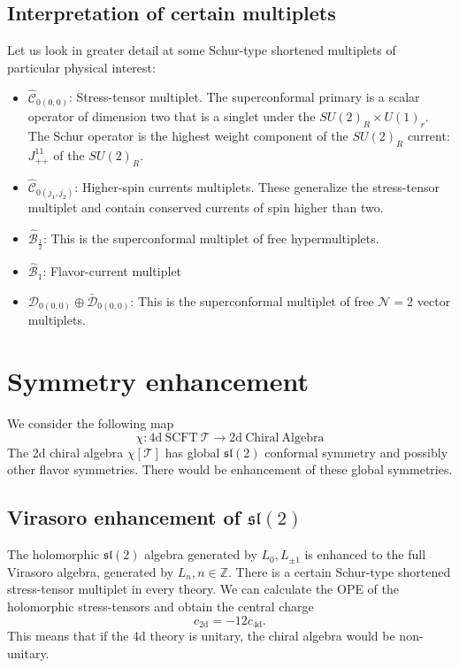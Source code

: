 \documentclass[a4paper,11pt]{article}
\begin{document}
\subsection{Interpretation of certain multiplets}
Let us look in greater detail at some Schur-type shortened multiplets of particular physical interest:
\begin{itemize}
    \item $\hat{\mathcal{C}}_{0(0,0)}$: Stress-tensor multiplet. The superconformal primary is a scalar operator of dimension two that is a singlet under the $SU(2)_R \times U(1)_r$. The Schur operator is the highest weight component of the $SU(2)_R$ current: $J^{11}_{+\dot{+}}$ of the $SU(2)_R$.
    \item $\hat{\mathcal{C}}_{0(j_1,j_2)}$: Higher-spin currents multiplets. These generalize the stress-tensor multiplet and contain conserved currents of spin higher than two.
    \item $\hat{\mathcal{B}}_{\frac{1}{2}}$: This is the superconformal multiplet of free hypermultiplets.
    \item $\hat{\mathcal{B}}_1$: Flavor-current multiplet
    \item $\mathcal{D}_{0(0,0)} \oplus \bar{\mathcal{D}}_{0(0,0)}$: This is the superconformal multiplet of free $\mathcal{N}=2$ vector multiplets.
\end{itemize}

\section{Symmetry enhancement}
We consider the following map
\begin{equation}
    \chi: \mathrm{4d~SCFT~}\mathcal{T} \to \mathrm{2d~Chiral~ Algebra}
\end{equation}
The 2d chiral algebra $\chi[\mathcal{T}]$ has global $\mathfrak{sl}(2)$ conformal symmetry and possibly other flavor symmetries. There would be enhancement of these global symmetries.

\subsection{Virasoro enhancement of $\mathfrak{sl}(2)$}
The holomorphic $\mathfrak{sl}(2)$ algebra generated by $L_0, L_{\pm 1}$ is enhanced to the full Virasoro algebra, generated by $L_n, n \in \mathbb{Z}$. There is a certain Schur-type shortened stress-tensor multiplet in every theory. We can calculate the OPE of the holomorphic stress-tensors and obtain the central charge
\begin{equation}
    c_{\mathrm{2d}} = -12 c_{\mathrm{4d}}.
\end{equation}
This means that if the 4d theory is unitary, the chiral algebra would be non-unitary.
\end{document}

